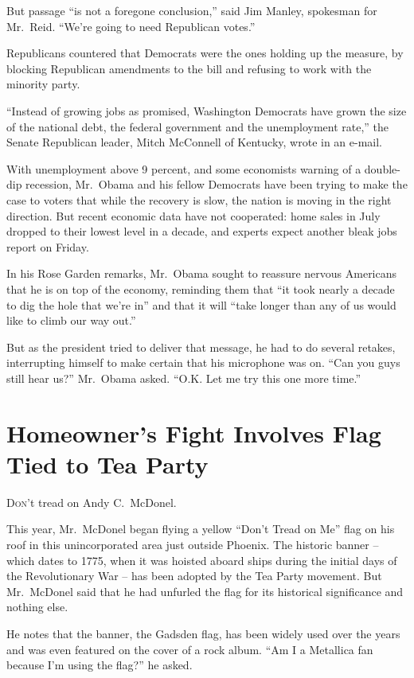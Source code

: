 ﻿\documentclass[12pt]{article}
\begin{document}
But passage ``is not a foregone conclusion,'' said Jim Manley, spokesman for Mr.~Reid. ``We're going
to need Republican votes.''

Republicans countered that Democrats were the ones holding up the measure, by blocking Republican
amendments to the bill and refusing to work with the minority party.

``Instead of growing jobs as promised, Washington Democrats have grown the size of the national
debt, the federal government and the unemployment rate,'' the Senate Republican leader, Mitch
McConnell of Kentucky, wrote in an e-mail.

With unemployment above 9 percent, and some economists warning of a double-dip recession, Mr.~Obama
and his fellow Democrats have been trying to make the case to voters that while the recovery is
slow, the nation is moving in the right direction. But recent economic data have not cooperated:
home sales in July dropped to their lowest level in a decade, and experts expect another bleak jobs
report on Friday.

In his Rose Garden remarks, Mr.~Obama sought to reassure nervous Americans that he is on top of the
economy, reminding them that ``it took nearly a decade to dig the hole that we're in'' and that it
will ``take longer than any of us would like to climb our way out.''

But as the president tried to deliver that message, he had to do several retakes, interrupting
himself to make certain that his microphone was on. ``Can you guys still hear us?'' Mr.~Obama asked.
``O.K. Let me try this one more time.''

\pagebreak
\section{Homeowner's Fight Involves Flag Tied to Tea Party}

\lettrine{D}{on}'t tread on Andy C.~McDonel.

This year, Mr.~McDonel began flying a yellow ``Don't Tread on Me'' flag on his roof in this
unincorporated area just outside Phoenix. The historic banner -- which dates to 1775, when it was
hoisted aboard ships during the initial days of the Revolutionary War -- has been adopted by the Tea
Party movement. But Mr.~McDonel said that he had unfurled the flag for its historical significance
and nothing else.

He notes that the banner, the Gadsden flag, has been widely used over the years and was even
featured on the cover of a rock album. ``Am I a Metallica fan because I'm using the flag?'' he
asked.
\end{document}
